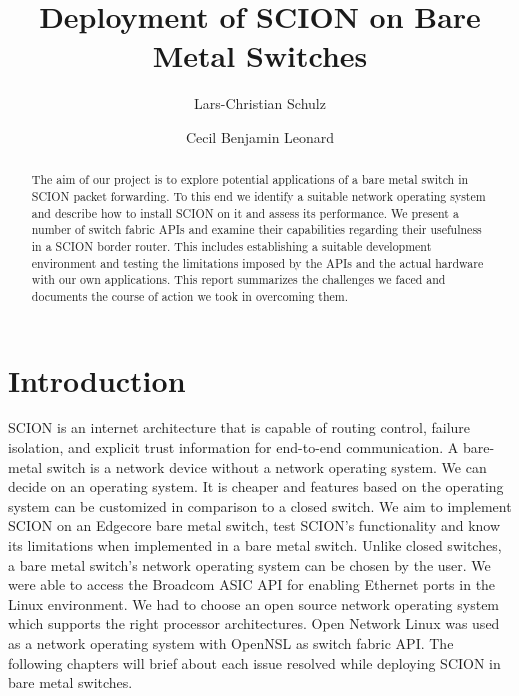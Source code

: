 \documentclass[a4paper]{article}
\begin{document}
\title{Deployment of SCION on Bare Metal Switches}
\author{Lars-Christian Schulz \and Cecil Benjamin Leonard}

\maketitle

\begin{abstract}
The aim of our project is to explore potential applications of a bare metal switch in SCION packet forwarding. To this end we identify a suitable network operating system and describe how to install SCION on it and assess its performance. We present a number of switch fabric APIs and examine their capabilities regarding their usefulness in a SCION border router. This includes establishing a suitable development environment and testing the limitations imposed by the APIs and the actual hardware with our own applications. This report summarizes the challenges we faced and documents the course of action we took in overcoming them.
\end{abstract}

\tableofcontents

\section{Introduction}
SCION is an internet architecture that is capable of routing control, failure isolation, and explicit trust information for end-to-end communication. A bare-metal switch is a network device without a network operating system. We can decide on an operating system. It is cheaper and features based on the operating system can be customized in comparison to a closed switch. We aim to implement SCION on an Edgecore bare metal switch, test SCION's functionality and know its limitations when implemented in a bare metal switch. Unlike closed switches, a bare metal switch's network operating system can be chosen by the user. We were able to access the Broadcom ASIC API for enabling Ethernet ports in the Linux environment. We had to choose an open source network operating system which supports the right processor architectures. Open Network Linux was used as a network operating system with OpenNSL as switch fabric API. The following chapters will brief about each issue resolved while deploying SCION in bare metal switches.

\end{document}
